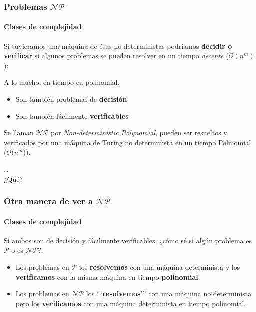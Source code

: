\documentclass[spanish, c]{beamer}
\newcommand{\bigO}{\mathcal{O}}
\begin{document}
\begin{frame}
    \frametitle{Problemas \texorpdfstring{$\mathcal{NP}$}{NP}}
    \framesubtitle{Clases de complejidad}
    Si tuviéramos una máquina de ésas \alert{no deterministas} podríamos \textbf{decidir o verificar} si algunos problemas se pueden resolver en un tiempo \textit{decente} ($\bigO(n^m)$):
    \begin{center}
        \Large A lo mucho, en tiempo en \alert{polinomial}.
    \end{center} \pause
    \begin{itemize}
        \item Son también problemas de \textbf{decisión}
        \item Son también fácilmente \textbf{verificables}
    \end{itemize} \pause

    Se llaman $\mathcal{NP}$ por \textit{Non-deterministic Polynomial}, pueden ser resueltos y verificados por una máquina de Turing no determinista en un tiempo Polinomial ($\bigO(n^m$)).
\end{frame}

\begin{frame}[plain]
    \begin{center}
        \Huge
        \dots \\
        ¿Qué?
    \end{center}
\end{frame}

\begin{frame}
    \frametitle{Otra manera de ver a \texorpdfstring{$\mathcal{NP}$}{NP}}
    \framesubtitle{Clases de complejidad}

    Si ambos son de decisión y fácilmente verificables, ¿cómo sé si algún problema es $\mathcal{P}$ o es $\mathcal{NP}$?. \pause

    \begin{itemize}
        \item Los problemas en $\mathcal{P}$ los \textbf{resolvemos} con una máquina \alert{determinista} y los \textbf{verificamos} con \alert{la misma máquina} en tiempo \textbf{polinomial}. \pause
        \item Los problemas en $\mathcal{NP}$ los ```\textbf{resolvemos}''' con una máquina \alert{no determinista} pero los \textbf{verificamos} con una máquina \alert{determinista} en tiempo polinomial.
    \end{itemize}

\end{frame}
\end{document}
